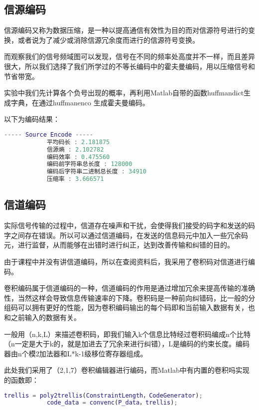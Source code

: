 \documentclass{../source/Experiment}
\begin{document}
\subsection{信源编码}
信源编码又称为数据压缩，是一种以提高通信有效性为目的而对信源符号进行的变换，或者说为了减少或消除信源冗余度而进行的信源符号变换。

而观察我们的信号频域图可以发现，信号在不同的频率处高度并不一样，而且差异很大，所以我们选择了我们所学过的不等长编码中的霍夫曼编码，用以压缩信号和节省带宽。

实验中我们先计算各个负号出现的概率，再利用Matlab自带的函数huffmandict生成字典，在通过huffmanenco 生成霍夫曼编码。

以下为编码结果：
\begin{lstlisting}[language = matlab]
            ----- Source Encode -----
            平均码长 : 2.181875
            信源熵 : 2.102782
            编码效率 : 0.475560
            编码前字符串总长度 : 128000
            编码后字符串二进制总长度 : 34910
            压缩率 : 3.666571
            \end{lstlisting}

\subsection{信道编码}
实际信号传输的过程中，信道存在噪声和干扰，会使得我们接受的码字和发送的码字之间存在错误。所以可以通过信道编码，在发送的信息码元中加入一些冗余码元，进行监督，从而能够在出错时进行纠正，达到改善传输和纠错的目的。

由于课程中并没有讲信道编码，所以在查阅资料后，我采用了卷积码对信道进行编码。

卷积编码属于信道编码的一种，信道编码的作用是通过增加冗余来提高传输的准确性，当然这样会导致信息传输速率的下降。卷积码是一种前向纠错码，比一般的分组码可以拥有更好的性能，因为卷积编码输出的每个码即和当前输入数据有关，也和之前输入的数据有关。

一般用（n,k,L）来描述卷积码，即我们输入k个信息比特经过卷积码编成n个比特（n一定是大于k的，就是加进去了冗余来进行纠错），L是编码的约束长度。编码器由n个模2加法器和L*k-1级移位寄存器组成。

此处我们采用了（2,1,7）卷积编辑器进行编码，而Matlab中有内置的卷积吗实现的函数即：


\begin{lstlisting}[language = matlab]
            trellis = poly2trellis(ConstraintLength，CodeGenerator);
            code_data = convenc(P_data，trellis);
            \end{lstlisting}
\end{document}
